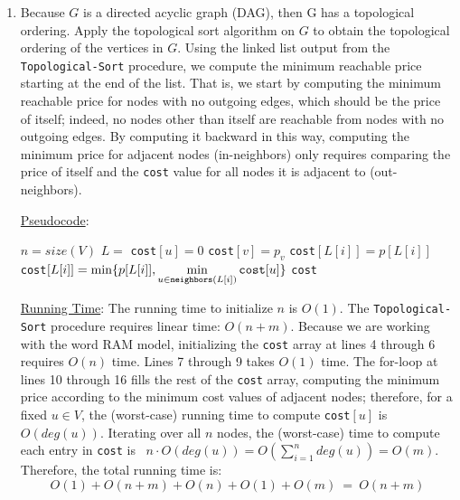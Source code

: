 \documentclass[twoside,11pt]{homework}
\newcommand\NoProc{\renewcommand\algorithmicprocedure{}}
\begin{document}
\begin{enumerate}[\bf (a)]

\item  Because $G$ is a directed acyclic graph (DAG), then G has a topological ordering.  Apply the topological sort algorithm on $G$ to obtain the topological ordering of the vertices in $G$.  Using the linked list output from the \texttt{Topological-Sort} procedure,  we compute the minimum reachable price starting at the end of the list.  That is,  we start by computing the minimum reachable price for nodes with no outgoing edges, which should be the price of itself; indeed,  no nodes other than itself are reachable from nodes with no outgoing edges.  By computing it backward in this way,  computing the minimum price for adjacent nodes (in-neighbors) only requires comparing the price of itself and the \texttt{cost} value for all nodes it is adjacent to (out-neighbors). 

\noindent
\underline{Pseudocode}:
\begin{algorithm}
\begin{algorithmic}[1]
\NoProc
{}
\State $n = size(V)$   
\State $L =$   
 
\State \texttt{cost}$[u] = 0$
\EndFor
{}
\State \texttt{cost}$[v] = p_v$  
\EndFor
\Else
{}
   
\State \texttt{cost}$[L[i]] = p[L[i]]$   
\Else
\State \texttt{cost}$[L[i]] = \mathlarger{\min \{p[L[i]],  \min_{u \in \texttt{neighbors}(L[i])} \texttt{cost}[u]\}}$
\EndIf
\EndFor
\EndIf
\State \Return \texttt{cost}
\EndProcedure
\end{algorithmic}
\end{algorithm}

\noindent
\underline{Running Time}:  The running time to initialize $n$ is $O(1)$.  The \texttt{Topological-Sort} procedure requires linear time: $O(n+m)$.  Because we are working with the word RAM model,  initializing the \texttt{cost} array at lines 4 through 6 requires $O(n)$ time.  Lines 7 through 9 takes $O(1)$ time.  The for-loop at lines 10 through 16 fills the rest of the \texttt{cost} array, computing the minimum price according to the minimum cost values of adjacent nodes; therefore,  for a fixed $u \in V$, the (worst-case) running time to compute \texttt{cost}$[u]$ is $O(deg(u))$. Iterating over all $n$ nodes, the (worst-case) time to compute each entry in \texttt{cost} is \ $n\cdot O(deg(u)) = O \left( \sum_{i=1}^n deg(u) \right) = O(m)$. Therefore, the total running time is:
$$ O(1) + O(n+m) + O(n) + O(1) + O(m) \ = \ O(n+m)$$


\end{enumerate}
\end{document}
